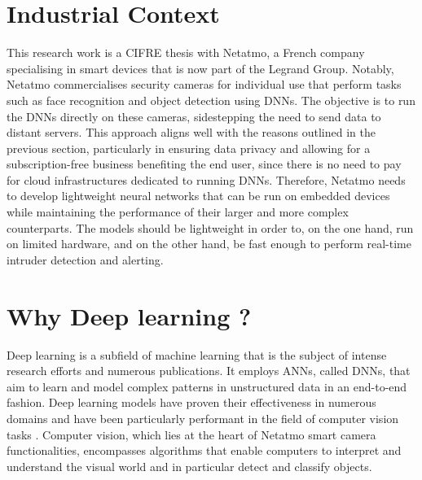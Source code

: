 \section{Industrial Context}


This research work is a CIFRE thesis with Netatmo, a French company specialising
in smart devices that is now part of the Legrand Group. Notably, Netatmo
commercialises security cameras for individual use that perform tasks such as
face recognition and object detection using \acp{DNN}. The objective is to run
the \acp{DNN} directly on these cameras, sidestepping the need to send data to
distant servers. This approach aligns well with the reasons outlined in the
previous section, particularly in ensuring data privacy and allowing for a
subscription-free business benefiting the end user, since there is no need to
pay for cloud infrastructures dedicated to running \acp{DNN}. Therefore, Netatmo
needs to develop lightweight neural networks that can be run on embedded devices
while maintaining the performance of their larger and more complex counterparts.
The models should be lightweight in order to, on the one hand, run on limited
hardware, and on the other hand, be fast enough to perform real-time intruder
detection and alerting.\\

\section{Why Deep learning ?}

Deep learning is a subfield of machine learning that is the subject of intense
research efforts and numerous publications. It employs \aclp{ANN}, called
\acfp{DNN}, that aim to learn and model complex patterns in unstructured data in
an end-to-end fashion. Deep learning models have proven their effectiveness in
numerous domains and have been particularly performant in the field of computer
vision tasks
\cite{DBLP:conf/cvpr/HeZRS16,DBLP:conf/nips/RenHGS15,DBLP:conf/eccv/LiuAESRFB16}.
Computer vision, which lies at the heart of Netatmo smart camera
functionalities, encompasses algorithms that enable computers to interpret and
understand the visual world and in particular detect and classify objects.\\


